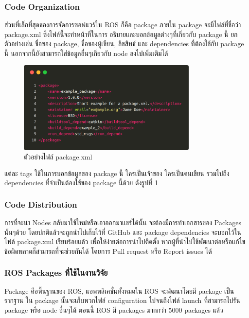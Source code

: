 \subsubsection*{Code Organization}
ส่วนที่เล็กที่สุดของการจัดการซอฟแวร์ใน ROS ก็คือ package ภายใน package จะมีไฟล์ที่ชื่อว่า package.xml
ซึ่งไฟล์นี้จะทำหน้าที่ในการ อธิบายและบอกข้อมูลต่างๆที่เกี่ยวกับ package นี้ ยกตัวอย่างเช่น
ชื่อของ package, ชื่อของผู้เขียน, ลิขสิทธ์ และ dependencies ที่ต้องใช้กับ package นี้
นอกจากนี้ยังสามารถใส่ข้อมูลอื่นๆเกี่ยวกับ node ลงไปเพิ่มเติมได้

\begin{figure}[htbp]
    \centering
    \includegraphics[width=0.8\textwidth]{chapter2/images/example_packagexml.png}
	\caption{ตัวอย่างไฟล์ package.xml}
    \label{fig:example_packagexml}
\end{figure}

แต่ละ tags ใช้ในการบอกข้อมูลของ package นี้ ใครเป็นเจ้าของ ใครเป็นคนเขียน รวมไปถึง dependencies
ที่จำเป็นต้องใช้ของ package นี้ด้วย ดังรูปที่ \ref{fig:example_packagexml} 

\clearpage
\subsubsection*{Code Distribution}
การที่จะนำ Nodes กลับมาใช้ใหม่หรือเอาออกมาแชร์ได้นั้น จะต้องมีการทำเอกสารของ Packages นั้นๆด้วย
โดยปกติแล้วจะถูกนำไปเก็บไว้ที่ GitHub และ package dependencies จะบอกไว้ในไฟล์ package.xml
เรียบร้อยแล้ว เพื่อให้ง่ายต่อการนำไปติดตั้ง หากผู้ที่นำไปใช้พัฒนาต่อหรือแก้ไขข้อผิดพลาดก็สามารถที่จะช่วยกันได้
โดยการ Pull request หรือ Report issues ได้

\subsubsection*{ROS Packages ที่ใช้ในงานวิจัย}
Package คือพื้นฐานของ ROS, แอพพลิเคชั่นทั้งหมดใน ROS จะพัฒนาโดยมี package เป็นรากฐาน ใน package นั้นจะเก็บพวกไฟล์
configuration ไปจนถึงไฟล์ launch ที่สามารถไปรัน package หรือ node อื่นๆได้ ตอนนี้ ROS มี packages มากกว่า 5000 packages แล้ว

